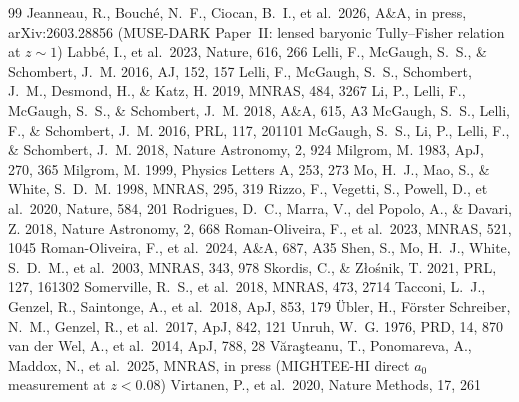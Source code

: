 \documentclass[twocolumn,letterpaper]{aastex631}
\newcommand{\azero}{a_0}
\begin{document}
\begin{thebibliography}{99}
  Jeanneau, R., Bouch\'e, N.~F., Ciocan, B.~I., et al.\ 2026,
  A\&A, in press, arXiv:2603.28856 (MUSE-DARK Paper~II:
  lensed baryonic Tully--Fisher relation at $z\!\sim\!1$)
  Labb\'e, I., et al.\ 2023, Nature, 616, 266
  Lelli, F., McGaugh, S.~S., \& Schombert, J.~M. 2016, AJ, 152, 157
  Lelli, F., McGaugh, S.~S., Schombert, J.~M., Desmond, H., \&
  Katz, H. 2019, MNRAS, 484, 3267
  Li, P., Lelli, F., McGaugh, S.~S., \& Schombert, J.~M. 2018, A\&A,
  615, A3
  McGaugh, S.~S., Lelli, F., \& Schombert, J.~M. 2016, PRL, 117, 201101
  McGaugh, S.~S., Li, P., Lelli, F., \& Schombert, J.~M. 2018,
  Nature Astronomy, 2, 924
  Milgrom, M. 1983, ApJ, 270, 365
  Milgrom, M. 1999, Physics Letters A, 253, 273
  Mo, H.~J., Mao, S., \& White, S.~D.~M. 1998, MNRAS, 295, 319
  Rizzo, F., Vegetti, S., Powell, D., et al.\ 2020, Nature, 584, 201
  Rodrigues, D.~C., Marra, V., del Popolo, A., \& Davari, Z. 2018,
  Nature Astronomy, 2, 668
  Roman-Oliveira, F., et al.\ 2023, MNRAS, 521, 1045
  Roman-Oliveira, F., et al.\ 2024, A\&A, 687, A35
  Shen, S., Mo, H.~J., White, S.~D.~M., et al.\ 2003, MNRAS, 343, 978
  Skordis, C., \& Z{\l}o\'snik, T. 2021, PRL, 127, 161302
  Somerville, R.~S., et al.\ 2018, MNRAS, 473, 2714
  Tacconi, L.~J., Genzel, R., Saintonge, A., et al.\
  2018, ApJ, 853, 179
  {\"U}bler, H., F\"orster Schreiber, N.~M., Genzel, R., et al.\
  2017, ApJ, 842, 121
\bibitem[Unruh(1976)]{Unruh1976}
  Unruh, W.~G. 1976, PRD, 14, 870
  van der Wel, A., et al.\ 2014, ApJ, 788, 28
  V\u{a}ra\c{s}teanu, T., Ponomareva, A., Maddox, N., et al.\
  2025, MNRAS, in press (MIGHTEE-HI direct $\azero$
  measurement at $z\!<\!0.08$)
\bibitem[Virtanen et al.(2020)]{Virtanen2020}
  Virtanen, P., et al.\ 2020, Nature Methods, 17, 261
\end{thebibliography}
\end{document}
